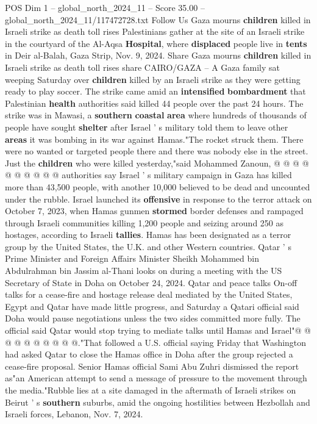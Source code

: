 \begin{textsample}{POS Dim 1 – global\_north\_2024\_11 – Score 35.00 – global\_north\_2024\_11/117472728.txt}  \label{ex:f1_pos_337}
Follow Us Gaza mourns \textbf{children} killed in Israeli strike as death toll rises Palestinians gather at the site of an Israeli strike in the courtyard of the Al-Aqsa \textbf{Hospital}, where \textbf{displaced} people live in \textbf{tents} in Deir al-Balah, Gaza Strip, Nov. 9, 2024.
Share Gaza mourns \textbf{children} killed in Israeli strike as death toll rises share CAIRO/GAZA -- A Gaza family sat weeping Saturday over \textbf{children} killed by an Israeli strike as they were getting ready to play soccer.
The strike came amid an \textbf{intensified} \textbf{bombardment} that Palestinian \textbf{health} authorities said killed 44 people over the past 24 hours.
The strike was in Mawasi, a \textbf{southern} \textbf{coastal} \textbf{area} where hundreds of thousands of people have sought \textbf{shelter} after Israel ' s military told them to leave other \textbf{areas} it was bombing in its war against Hamas."The rocket struck them.
There were no wanted or targeted people there and there was nobody else in the street.
Just the \textbf{children} who were killed yesterday,"said Mohammed Zanoun, @ @ @ @ @ @ @ @ @ @ authorities say Israel ' s military campaign in Gaza has killed more than 43,500 people, with another 10,000 believed to be dead and uncounted under the rubble.
Israel launched its \textbf{offensive} in response to the terror attack on October 7, 2023, when Hamas gunmen \textbf{stormed} border defenses and rampaged through Israeli communities killing 1,200 people and seizing around 250 as hostages, according to Israeli \textbf{tallies}.
Hamas has been designated as a terror group by the United States, the U.K. and other Western countries.
Qatar ' s Prime Minister and Foreign Affairs Minister Sheikh Mohammed bin Abdulrahman bin Jassim al-Thani looks on during a meeting with the US Secretary of State in Doha on October 24, 2024.
Qatar and peace talks On-off talks for a cease-fire and hostage release deal mediated by the United States, Egypt and Qatar have made little progress, and Saturday a Qatari official said Doha would pause negotiations unless the two sides committed more fully.
The official said Qatar would stop trying to mediate talks until Hamas and Israel"@ @ @ @ @ @ @ @ @ @."That followed a U.S. official saying Friday that Washington had asked Qatar to close the Hamas office in Doha after the group rejected a cease-fire proposal.
Senior Hamas official Sami Abu Zuhri dismissed the report as"an American attempt to send a message of pressure to the movement through the media."Rubble lies at a site damaged in the aftermath of Israeli strikes on Beirut ' s \textbf{southern} suburbs, amid the ongoing hostilities between Hezbollah and Israeli forces, Lebanon, Nov. 7, 2024.

\end{textsample}
